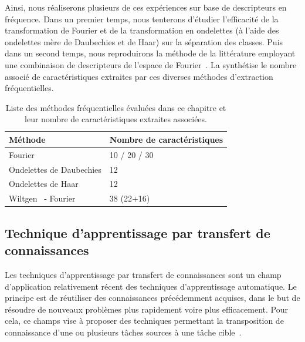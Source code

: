 Ainsi, nous réaliserons plusieurs de ces expériences sur base de descripteurs en fréquence. Dans un premier temps, nous tenterons d'étudier l'efficacité de la transformation de Fourier et de la transformation en ondelettes (à l'aide des ondelettes mère de Daubechies et de Haar) sur la séparation des classes. Puis dans un second temps, nous reproduirons la méthode de la littérature employant une combinaison de descripteurs de l'espace de Fourier~\cite{Wiltgen2008}. La  synthétise le nombre associé de caractéristiques extraites par ces diverses méthodes d'extraction fréquentielles.\par

\begin{table}[H]
    \centering
    \begin{tabular}{ll}
        \toprule
        \textbf{Méthode}                        & \textbf{Nombre de caractéristiques}   \\ \hline
        Fourier                                 & 10 / 20 / 30                          \\ \hline
        Ondelettes de Daubechies                & 12                                    \\ \hline
        Ondelettes de Haar                      & 12                                    \\ \hline
        Wiltgen~\cite{Wiltgen2008} - Fourier    & 38 (22+16)                             \\
        \bottomrule
    \end{tabular}
    \caption{Liste des méthodes fréquentielles évaluées dans ce chapitre et leur nombre de caractéristiques extraites associées.}
    \label{tab:number_features_frequency}
\end{table}\par

\subsection{Technique d'apprentissage par transfert de connaissances}
Les techniques d'apprentissage par transfert de connaissances sont un champ d'application relativement récent des techniques d'apprentissage automatique. Le principe est de réutiliser des connaissances précédemment acquises, dans le but de résoudre de nouveaux problèmes plus rapidement voire plus efficacement. Pour cela, ce champs vise à proposer des techniques permettant la transposition de connaissance d'une ou plusieurs tâches sources à une tâche cible~\cite{QiangYang2010}.\par

